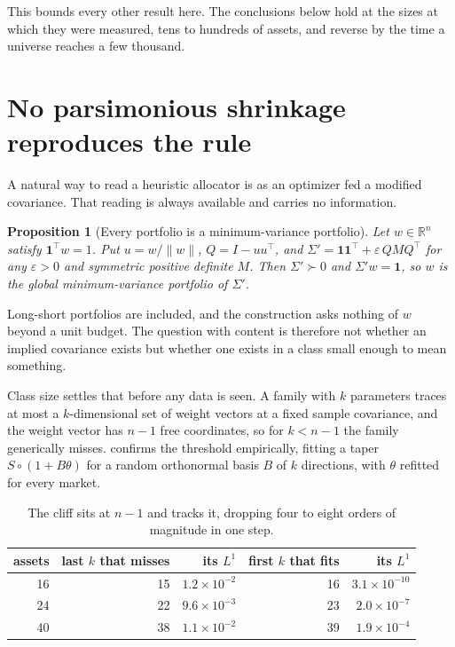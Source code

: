 \documentclass[11pt]{article}
\newcommand{\R}{\mathbb{R}}
\newcommand{\one}{\mathbf{1}}
\newtheorem{proposition}{Proposition}
\begin{document}
This bounds every other result here. The conclusions below hold at the sizes
at which they were measured, tens to hundreds of assets, and reverse by the
time a universe reaches a few thousand.

\section{No parsimonious shrinkage reproduces the rule}

A natural way to read a heuristic allocator is as an optimizer fed a modified
covariance. That reading is always available and carries no information.

\begin{proposition}[Every portfolio is a minimum-variance portfolio]
\label{prop:implied}
Let $w \in \R^n$ satisfy $\one^\top w = 1$. Put $u = w/\|w\|$,
$Q = I - uu^\top$, and $\Sigma' = \one\one^\top + \varepsilon\,QMQ^\top$ for
any $\varepsilon > 0$ and symmetric positive definite $M$. Then
$\Sigma' \succ 0$ and $\Sigma' w = \one$, so $w$ is the global
minimum-variance portfolio of $\Sigma'$.
\end{proposition}

Long-short portfolios are included, and the construction asks nothing of $w$
beyond a unit budget. The question with content is therefore not whether an
implied covariance exists but whether one exists in a class small enough to
mean something.

Class size settles that before any data is seen. A family with $k$ parameters
traces at most a $k$-dimensional set of weight vectors at a fixed sample
covariance, and the weight vector has $n-1$ free coordinates, so for
$k < n-1$ the family generically misses.  confirms the
threshold empirically, fitting a taper $S \circ (1 + B\theta)$ for a random
orthonormal basis $B$ of $k$ directions, with $\theta$ refitted for every
market.

\begin{table}[ht]
\centering
\begin{tabular}{rrrrr}
\toprule
assets & last $k$ that misses & its $L^1$ & first $k$ that fits & its $L^1$ \\
\midrule
16 & 15 & $1.2\times 10^{-2}$ & 16 & $3.1\times 10^{-10}$ \\
24 & 22 & $9.6\times 10^{-3}$ & 23 & $2.0\times 10^{-7}$ \\
40 & 38 & $1.1\times 10^{-2}$ & 39 & $1.9\times 10^{-4}$ \\
\bottomrule
\end{tabular}
\caption{The cliff sits at $n-1$ and tracks it, dropping four to eight orders
of magnitude in one step.}
\label{tab:cliff}
\end{table}
\end{document}
